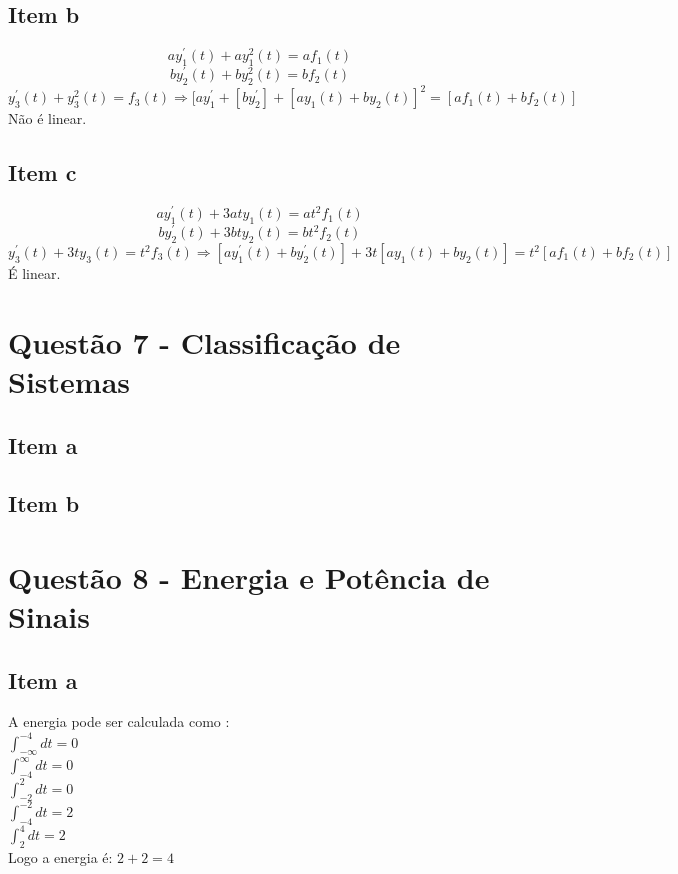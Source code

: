\documentclass[a4paper, 12pt]{article}
\begin{document}
        \subsection{Item b}
        \[ay_{1}^{'}(t) + ay_{1}^{2}(t) = af_{1}(t)\]
        \[by_{2}^{'}(t) + by_{2}^{2}(t) = bf_{2}(t)\]     
        \[y_{3}^{'}(t) + y_{3}^{2}(t) = f_{3}(t) \Rightarrow [ay_{1}^{'} + [by_{2}^{'}] + [ay_{1}(t) + by_{2}(t)]^{2}=[af_{1}(t) + bf_{2}(t)]\]       
        Não é linear.
        \subsection{Item c}
        \[ay_{1}^{'}(t) + 3aty_{1}(t) = at^{2}f_{1}(t)\]
        \[by_{2}^{'}(t) + 3bty_{2}(t) = bt^{2}f_{2}(t)\]           
        \[y_{3}^{'}(t) + 3ty_{3}(t) = t^{2}f_{3}(t) \Rightarrow [ay_{1}^{'}(t) + by_{2}^{'}(t)] + 3t[ay_{1}(t) + by_{2}(t)] = t^{2}[af_{1}(t) + bf_{2}(t)]\]   
        É linear.
    \section{Quest\~{a}o 7 - Classificação de Sistemas}
        \subsection{Item a}
        \subsection{Item b}
    \section{Quest\~{a}o 8 - Energia e Potência de Sinais}
        \subsection{Item a}
        A energia pode ser calculada como :\\
        $\int_{-\infty}^{-4}dt = 0$\\
        $\int_{-4}^{\infty}dt = 0$\\
        $\int_{-2}^{2}dt = 0$ \\
        $\int_{-4}^{-2}dt = 2$ \\
        $\int_{2}^{4}dt = 2$\\
        Logo a energia é: $2+2 = 4$
\end{document}
